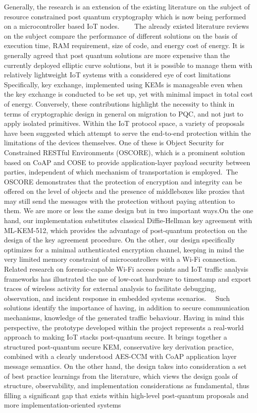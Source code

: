 \documentclass[a4paper]{scrartcl}
\begin{document}
    Generally, the research is an extension of the existing literature on the subject of resource constrained post quantum cryptography which is now being performed on a microcontroller based IoT nodes.~\cite{Tao2024} ~\cite{asif2021} ~\cite{al2025}The already existed literature reviews on the subject compare the performance of different solutions on the basis of execution time, RAM requirement, size of code, and energy cost of energy. It is generally agreed that post quantum solutions are more expensive than the currently deployed elliptic curve solutions, but it is possible to manage them with relatively lightweight IoT systems with a considered eye of cost limitations Specifically, key exchange, implemented using KEMs is manageable even when the key exchange is conducted to be set up, yet with minimal impact in total cost of energy. Conversely, these contributions highlight the necessity to think in terms of cryptographic design in general on migration to PQC, and not just to apply isolated primitives. Within the IoT protocol space, a variety of proposals have been suggested which attempt to serve the end-to-end protection within the limitations of the devices themselves. One of these is Object Security for Constrained RESTful Environments (OSCORE), which is a prominent solution based on CoAP and COSE to provide application-layer payload security between parties, independent of which mechanism of transportation is employed.~\cite{sel2019}The OSCORE demonstrates that the protection of encryption and integrity can be offered on the level of objects and the presence of middleboxes like proxies that may still send the messages with the protection without paying attention to them. We are more or less the same design but in two important ways.On the one hand, our implementation substitutes classical Diffie-Hellman key agreement with ML-KEM-512, which provides the advantage of post-quantum protection on the design of the key agreement procedure. On the other, our design specifically optimizes for a minimal authenticated encryption channel, keeping in mind the very limited memory constraint of microcontrollers with a Wi-Fi connection. Related research on forensic-capable Wi-Fi access points and IoT traffic analysis frameworks has illustrated the use of low-cost hardware to timestamp and export traces of wireless activity for external analysis to facilitate debugging, observation, and incident response in embedded systems scenarios.~\cite{fabio2023} ~\cite{tina2021}Such solutions identify the importance of having, in addition to secure communication mechanisms, knowledge of the generated traffic behaviour. Having in mind this perspective, the prototype developed within the project represents a real-world approach to making IoT stacks post-quantum secure. It brings together a structured post-quantum secure KEM, conservative key derivation practice, combined with a clearly understood AES-CCM with CoAP application layer message semantics. On the other hand, the design takes into consideration a set of best practice learnings from the literature, which views the design goals of structure, observability, and implementation considerations as fundamental, thus filling a significant gap that exists within high-level post-quantum proposals and more implementation-oriented systems 
\end{document}

